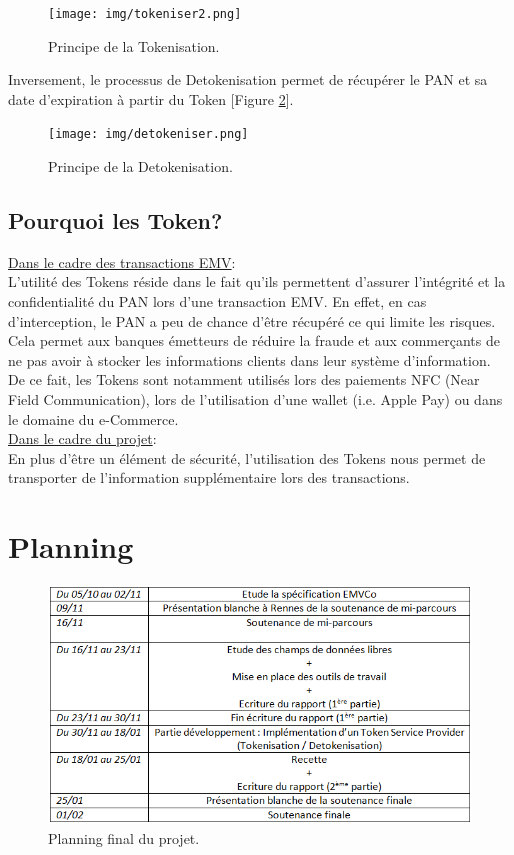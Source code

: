 \documentclass{report}
\begin{document}
\begin{figure}[!h]
    \centering
			\texttt{[image: img/tokeniser2.png]}
			\caption{\label{Tokenisation} Principe de la Tokenisation.}			
\end{figure}

Inversement, le processus de Detokenisation permet de récupérer le PAN et sa date d'expiration à partir du Token [Figure \ref{Detokenisation}]. 

\begin{figure}[!h]
    \centering
			\texttt{[image: img/detokeniser.png]}
			\caption{\label{Detokenisation} Principe de la Detokenisation.}			
\end{figure}

\subsection{Pourquoi les Token?}
\noindent
\underline{Dans le cadre des transactions EMV}:\\

\noindent
L'utilité des Tokens réside dans le fait qu'ils permettent d'assurer l'intégrité et la confidentialité du PAN lors d'une transaction EMV. En effet, en cas d'interception, le PAN a peu de chance d'être récupéré ce qui limite les risques. Cela permet aux banques émetteurs de réduire la fraude et aux commerçants de ne pas avoir à stocker les informations clients dans leur système d'information.\\

\noindent
De ce fait, les Tokens sont notamment utilisés lors des paiements NFC (Near Field Communication), lors de l'utilisation d'une wallet (i.e. Apple Pay) ou dans le domaine du e-Commerce.\\

\noindent
\underline{Dans le cadre du projet}:\\

\noindent
En plus d'être un élément de sécurité, l'utilisation des Tokens nous permet de transporter de l'information supplémentaire lors des transactions.


\newpage
\section{Planning}
\begin{figure}[!ht]
    \centering
			\includegraphics[scale=0.9]{img/planningFinal.png}
			\caption{\label{Planning} Planning final du projet.}			
\end{figure}
\end{document}
